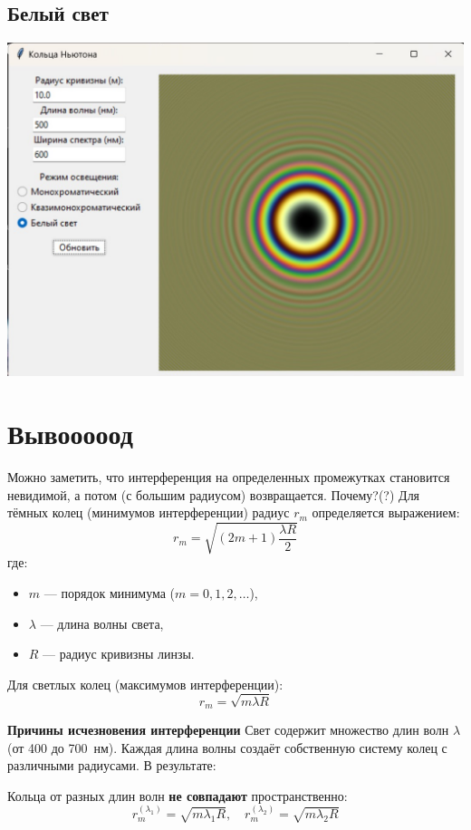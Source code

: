 \documentclass[a4paper,11pt]{article}
\theoremstyle{definition}
\begin{document}
    \subsection{Белый свет}
    \includegraphics[scale=0.7]{3. Newton's rings/demo results/whiteLight}


    \section{Вывооооод}
    Можно заметить, что интерференция на определенных промежутках становится невидимой, а потом (с большим радиусом) возвращается.
    Почему?(?)
    Для тёмных колец (минимумов интерференции) радиус $r_m$ определяется выражением:
    \[
        r_m = \sqrt{(2m + 1) \frac{\lambda R}{2}}
    \]
    где:
    \begin{itemize}
        \item $m$ — порядок минимума ($m = 0, 1, 2, \ldots$),
        \item $\lambda$ — длина волны света,
        \item $R$ — радиус кривизны линзы.
    \end{itemize}

    Для светлых колец (максимумов интерференции):
    \[
        r_m = \sqrt{m \lambda R}
    \]

    \textbf{Причины исчезновения интерференции}
    Свет содержит множество длин волн $\lambda$ (от 400 до 700~нм).
    Каждая длина волны создаёт собственную систему колец с различными радиусами.
    В результате:

    Кольца от разных длин волн \textbf{не совпадают} пространственно:
    \[
        r_m^{(\lambda_1)} = \sqrt{m \lambda_1 R}, \quad
        r_m^{(\lambda_2)} = \sqrt{m \lambda_2 R}
    \]
\end{document}
